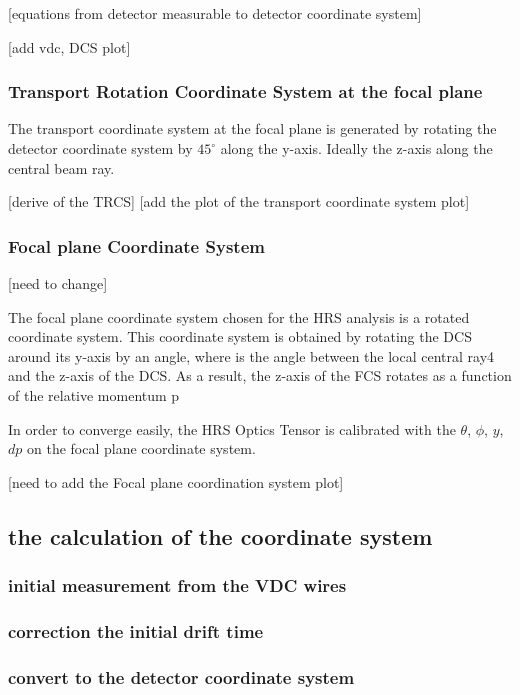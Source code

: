 [equations from detector measurable to detector coordinate system]


[add vdc, DCS plot]

\subsubsection{Transport Rotation Coordinate System at the focal plane}
The transport coordinate system at the focal plane is generated by rotating the detector coordinate system by $45^{\circ}$ along the y-axis. Ideally the z-axis along the central beam ray. 

[derive of the TRCS]
[add the plot of the transport coordinate system plot]


\subsubsection{Focal plane Coordinate System}

[need to change]

The focal plane coordinate system chosen for the HRS analysis is a rotated coordinate system. This coordinate system is obtained by rotating the DCS around its y-axis by an angle, where is the angle between the local central ray4 and the z-axis of the DCS. As a result, the z-axis of the FCS rotates as a function of
the relative momentum p

In order to converge easily, the HRS Optics Tensor is calibrated with the $\theta$, $\phi$, $y$, $dp$ on the focal plane coordinate system. 

[need to add the Focal plane coordination system plot]

\subsection{the calculation of the coordinate system}

\subsubsection{initial measurement from the VDC wires}
\subsubsection{correction the initial drift time}
\subsubsection{convert to the detector coordinate system}

